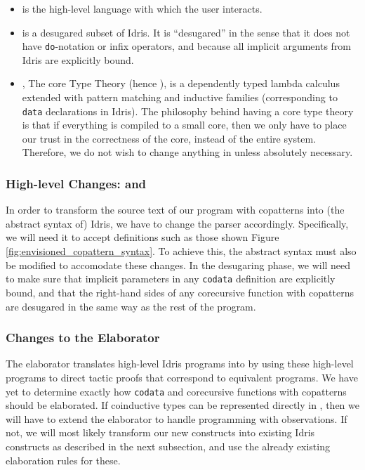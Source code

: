 \begin{itemize}
\item \Idris{} is the high-level language with which the user interacts.
\item \IdrisM{} %
is a desugared subset of Idris. It is ``desugared'' in the sense that it does not have \texttt{do}-notation or infix operators, and because all implicit arguments from Idris are explicitly bound.
\item \TT, The core Type Theory (hence \TT), is a dependently typed lambda calculus extended with pattern matching and inductive families (corresponding to \texttt{data} declarations in Idris). The philosophy behind having a core type theory is that if everything is compiled to a small core, then we only have to place our trust in the correctness of the core, instead of the entire system. Therefore, we do not wish to change anything in \TT{} unless absolutely necessary.
\end{itemize}

\subsubsection{High-level Changes: \Idris{} and \IdrisM{}}
In order to transform the source text of our program with copatterns into (the abstract syntax of) Idris, we have to change the parser accordingly. Specifically, we will need it to accept definitions such as those shown Figure \ref{fig:envisioned_copattern_syntax}. To achieve this, the abstract syntax must also be modified to accomodate these changes. In the desugaring phase, we will need to make sure that implicit parameters in any \texttt{codata} definition are explicitly bound, and that the right-hand sides of any corecursive function with copatterns are desugared in the same way as the rest of the program.

\subsubsection{Changes to the Elaborator}
The elaborator translates high-level Idris programs into \TT{} by using these high-level programs to direct tactic proofs that correspond to equivalent \TT{} programs. We have yet to determine exactly how \texttt{codata} and corecursive functions with copatterns should be elaborated. If coinductive types can be represented directly in \TT, then we will have to extend the elaborator to handle programming with observations. If not, we will most likely transform our new constructs into existing Idris constructs as described in the next subsection, and use the already existing elaboration rules for these.


